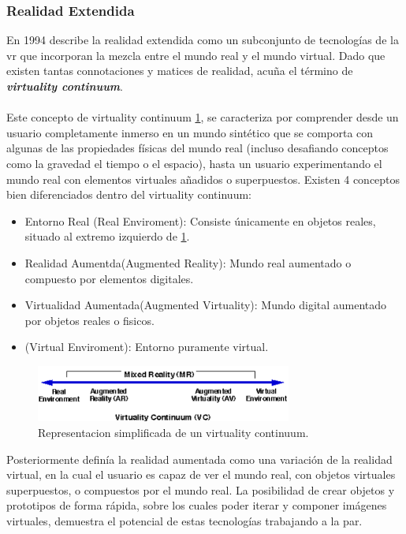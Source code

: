 \subsubsection{Realidad Extendida}
En 1994 \citeauthor{Milgram1994ATO} describe la realidad extendida como un subconjunto de tecnologías de la \acrfull{vr} que incorporan la mezcla entre el mundo real y el mundo virtual. 
Dado que existen tantas connotaciones y matices de realidad, \citeauthor{Milgram1994ATO} acuña el término de \textbf{\textit{virtuality continuum}}.
\paragraph{}
Este concepto de virtuality continuum \ref{fig:vc}, se caracteriza por comprender desde un usuario completamente inmerso en un mundo sintético que se comporta con algunas de las propiedades físicas del mundo real (incluso desafiando conceptos como la gravedad el tiempo o el espacio), hasta un usuario experimentando el mundo real con elementos virtuales añadidos o superpuestos.
Existen 4 conceptos bien diferenciados dentro del virtuality continuum:
\begin{itemize}
    \item Entorno Real (Real Enviroment): Consiste únicamente en objetos reales, situado al extremo izquierdo de \ref{fig:vc}.
    \item Realidad Aumentda(Augmented Reality): Mundo real aumentado o compuesto por elementos digitales.
    \item Virtualidad Aumentada(Augmented Virtuality): Mundo digital aumentado por objetos reales o fisicos.
    \item (Virtual Enviroment): Entorno puramente virtual.
\end{itemize}

\begin{figure}[hp!]
  \centering
  \includegraphics[width=0.75\textwidth]{imaxes/virtuality_continuum.png}
  \caption{Representacion simplificada de un virtuality continuum.}
  \label{fig:vc}
\end{figure}



Posteriormente \citeauthor{Azuma1997} definía la realidad aumentada como una variación de la realidad virtual, en la cual el usuario es capaz de ver el mundo real, con objetos virtuales superpuestos, o compuestos por el mundo real. La posibilidad de crear objetos y prototipos de forma rápida, sobre los cuales poder iterar y componer imágenes virtuales, demuestra el potencial de estas tecnologías trabajando a la par.
